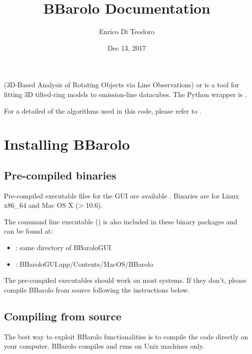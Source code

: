 \documentclass[letterpaper,10pt,english]{sphinxmanual}
\title{BBarolo Documentation}
\date{Dec 13, 2017}
\author{Enrico Di Teodoro}
\begin{document}
\maketitle
\sphinxtableofcontents
{}\label{\detokenize{index::doc}}


 (3D-Based Analysis of Rotating Objects via Line Observations) or  is a tool for fitting 3D tilted-ring models to emission-line datacubes. The Python wrapper is .

For a detailed of the algorithms used in this code, please refer to .



\chapter{Installing BBarolo}
\label{\detokenize{installing::doc}}\label{\detokenize{installing:welcome-to-bbarolo-s-and-pybbarolo-s-documentation}}\label{\detokenize{installing:installing-bbarolo}}

\section{Pre-compiled binaries}
\label{\detokenize{installing:pre-compiled-binaries}}
Pre-compiled executable files for the GUI are available . Binaries are for Linux x86\_64 and Mac OS X (\textgreater{} 10.6).

The command line executable () is also included in these binary packages and can be found at:
\begin{itemize}
\item {} 
: same directory of BBaroloGUI

\item {} 
: BBaroloGUI.app/Contents/MacOS/BBarolo

\end{itemize}

The pre-compiled executables should work on most systems. If they don’t, please compile BBarolo from source following the instructions below.


\section{Compiling from source}
\label{\detokenize{installing:compiling-from-source}}
The best way to exploit BBarolo functionalities is to compile the code directly on your computer.
BBarolo compiles and runs on Unix machines only.
\end{document}
